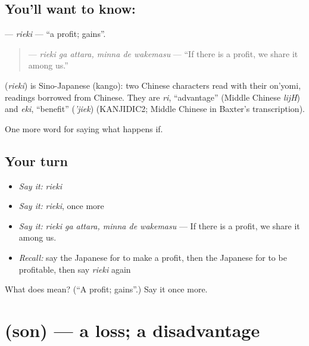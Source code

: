 \subsection*{You'll want to know: }
\textbf{} — \emph{rieki} — \textquotedblleft{}a profit; gains\textquotedblright{}.

\begin{quote}
\textbf{  } — \emph{rieki ga attara, minna de wakemasu} — \textquotedblleft{}If there is a profit, we share it among us.\textquotedblright{}
\end{quote}

\begin{cousinweb}
\textbf{} (\emph{rieki}) is Sino-Japanese (kango): two Chinese characters read with their on'yomi, readings borrowed from Chinese. They are \emph{ri}, \textquotedblleft{}advantage\textquotedblright{} (Middle Chinese \emph{lijH}) and \emph{eki}, \textquotedblleft{}benefit\textquotedblright{} (\emph{'jiek}) (KANJIDIC2; Middle Chinese in Baxter's transcription).
\end{cousinweb}

\begin{grammarlens}[title={What you've built}]
One more word for saying what happens if.
\end{grammarlens}

\subsection*{Your turn}
\begin{itemize}
\raggedright
  \item \emph{Say it:} \emph{rieki}
  \item \emph{Say it:} \emph{rieki}, once more
  \item \emph{Say it:} \emph{rieki ga attara, minna de wakemasu} — If there is a profit, we share it among us.
  \item \emph{Recall:} say the Japanese for to make a profit, then the Japanese for to be profitable, then say \emph{rieki} again
\end{itemize}

\begin{tcolorbox}[breakable,colback=teal!4,colframe=teal!35!black,title={Before you move on}]
What does  mean? (\textquotedblleft{}A profit; gains\textquotedblright{}.) Say it once more.
\end{tcolorbox}
\section[\texorpdfstring{\ja{そん} (son)}{そん (son)}]{ (son) — a loss; a disadvantage}

